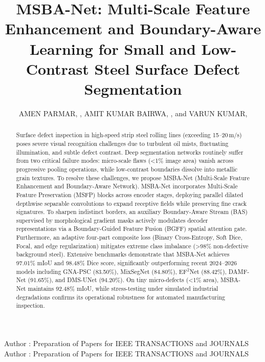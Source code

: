 \documentclass{ieeeaccess}
\begin{document}

\title{MSBA-Net: Multi-Scale Feature Enhancement and Boundary-Aware Learning for Small and Low-Contrast Steel Surface Defect Segmentation}

\author{\uppercase{Amen Parmar}, ,
\uppercase{Amit Kumar Bairwa}, ,
and \uppercase{Varun Kumar}, }

\address[1]{Department of Computer Science and Engineering, Manipal University Jaipur, Jaipur, Rajasthan 303007, India}

\markboth
{Author \headeretal: Preparation of Papers for IEEE TRANSACTIONS and JOURNALS}
{Author \headeretal: Preparation of Papers for IEEE TRANSACTIONS and JOURNALS}


\begin{abstract}
Surface defect inspection in high-speed strip steel rolling lines (exceeding 15--20\,m/s) poses severe visual recognition challenges due to turbulent oil mists, fluctuating illumination, and subtle defect contrast. Deep segmentation networks routinely suffer from two critical failure modes: micro-scale flaws (<1\% image area) vanish across progressive pooling operations, while low-contrast boundaries dissolve into metallic grain textures. To resolve these challenges, we propose MSBA-Net (Multi-Scale Feature Enhancement and Boundary-Aware Network). MSBA-Net incorporates Multi-Scale Feature Preservation (MSFP) blocks across encoder stages, deploying parallel dilated depthwise separable convolutions to expand receptive fields while preserving fine crack signatures. To sharpen indistinct borders, an auxiliary Boundary-Aware Stream (BAS) supervised by morphological gradient masks actively modulates decoder representations via a Boundary-Guided Feature Fusion (BGFF) spatial attention gate. Furthermore, an adaptive four-part composite loss (Binary Cross-Entropy, Soft Dice, Focal, and edge regularization) mitigates extreme class imbalance (>98\% non-defective background steel). Extensive benchmarks demonstrate that MSBA-Net achieves 97.01\% mIoU and 98.48\% Dice score, significantly outperforming recent 2024--2026 models including GNA-PSC (83.50\%), MixSegNet (84.80\%), EF$^2$Net (88.42\%), DAMF-Net (91.65\%), and DMS-UNet (94.20\%). On tiny micro-defects (<1\% area), MSBA-Net maintains 92.48\% mIoU, while stress-testing under simulated industrial degradations confirms its operational robustness for automated manufacturing inspection.
\end{abstract}
\end{document}
